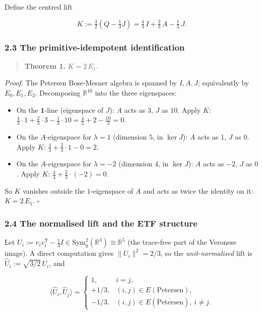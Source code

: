 \documentclass[
]{article}
\providecommand{\tightlist}{%
  \setlength{\itemsep}{0pt}\setlength{\parskip}{0pt}}
\begin{document}
Define the centred lift

\[
K := \tfrac{3}{2}\left(Q - \tfrac{1}{3}J\right)
   = \tfrac{4}{3}\,I + \tfrac{2}{3}\,A - \tfrac{1}{3}\,J.
\]

\subsubsection{2.3 The primitive-idempotent
identification}\label{the-primitive-idempotent-identification}

\begin{quote}
\textbf{Theorem 1.} \(K = 2\,E_1\).
\end{quote}

\emph{Proof.} The Petersen Bose-Mesner algebra is spanned by
\(I, A, J\); equivalently by \(E_0, E_1, E_2\). Decomposing
\(\mathbb{R}^{10}\) into the three eigenspaces:

\begin{itemize}
\tightlist
\item
  On the \(\mathbf 1\)-line (eigenspace of \(J\)): \(A\) acts as \(3\),
  \(J\) as \(10\). Apply \(K\):
  \(\tfrac{4}{3}\cdot 1 + \tfrac{2}{3}\cdot 3 - \tfrac{1}{3}\cdot 10
  = \tfrac{4}{3} + 2 - \tfrac{10}{3} = 0\).
\item
  On the \(A\)-eigenspace for \(\lambda = 1\) (dimension \(5\), in
  \(\ker J\)): \(A\) acts as \(1\), \(J\) as \(0\). Apply \(K\):
  \(\tfrac{4}{3} + \tfrac{2}{3}\cdot 1 - 0 = 2\).
\item
  On the \(A\)-eigenspace for \(\lambda = -2\) (dimension \(4\), in
  \(\ker J\)): \(A\) acts as \(-2\), \(J\) as \(0\). Apply \(K\):
  \(\tfrac{4}{3} + \tfrac{2}{3}\cdot(-2) = 0\).
\end{itemize}

So \(K\) vanishes outside the \(1\)-eigenspace of \(A\) and acts as
twice the identity on it: \(K = 2\,E_1\). \(\square\)

\subsubsection{2.4 The normalised lift and the ETF
structure}\label{the-normalised-lift-and-the-etf-structure}

Let
\(U_i := v_i v_i^{\mathsf T} - \tfrac{1}{3}I \in \mathrm{Sym}^2_0(\mathbb{R}^3)
\cong \mathbb{R}^5\) (the trace-free part of the Veronese image). A
direct computation gives \(\|U_i\|^2 = 2/3\), so the
\emph{unit-normalised} lift is \(\hat U_i := \sqrt{3/2}\,U_i\), and

\[
\langle \hat U_i, \hat U_j\rangle =
\begin{cases}
1, & i = j, \\
+1/3, & (i,j) \in E(\text{Petersen}), \\
-1/3, & (i,j) \in E(\overline{\text{Petersen}}),\ i \neq j.
\end{cases}
\]
\end{document}
